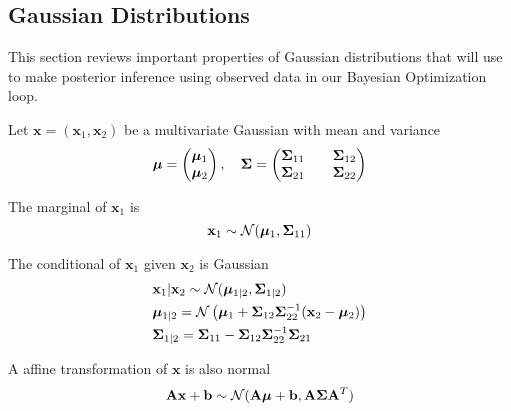 \subsection{Gaussian Distributions}

This section reviews important properties of Gaussian distributions that will use to make posterior inference using observed data in our Bayesian Optimization loop.


\begin{theorem}\label{thm:ogag}
    Let $\mathbf{x} = (\mathbf{x}_1, \mathbf{x}_2)$ be a multivariate Gaussian with mean and variance
    \begin{equation*}
        \boldsymbol{\mu} = \begin{pmatrix}
            \boldsymbol{\mu}_1 \\ \boldsymbol{\mu}_2
        \end{pmatrix},\quad
        \boldsymbol{\Sigma} = \begin{pmatrix}
            \boldsymbol{\Sigma}_{11} && \boldsymbol{\Sigma}_{12} \\
            \boldsymbol{\Sigma}_{21} && \boldsymbol{\Sigma}_{22} \\
        \end{pmatrix}
    \end{equation*}

    The marginal of $\mathbf{x}_1$ is
    \begin{equation*}
        \mathbf{x}_{1} \sim \mathcal{N}(\boldsymbol{\mu}_1, \boldsymbol{\Sigma}_{11})
    \end{equation*}
    
    The conditional of $\mathbf{x}_1$ given $\mathbf{x}_2$ is Gaussian
    \begin{align*}
        &\mathbf{x}_1 | \mathbf{x}_2 \sim \mathcal{N}(\boldsymbol{\mu}_{1 | 2}, \boldsymbol{\Sigma}_{1 | 2}) \\
        &\boldsymbol{\mu}_{1 | 2} = \mathcal{N}\left(\boldsymbol{\mu}_1 + \boldsymbol{\Sigma}_{12} \boldsymbol{\Sigma}_{22}^{-1} (\mathbf{x}_2 - \boldsymbol{\mu}_2)\right) \\
        &\boldsymbol{\Sigma}_{1|2 } = \boldsymbol{\Sigma}_{11} - \boldsymbol{\Sigma}_{12} \boldsymbol{\Sigma}_{22}^{-1} \boldsymbol{\Sigma}_{21}
    \end{align*}
    
    A affine transformation of $\mathbf{x}$ is also normal
    \begin{equation*}
        \mathbf{Ax} + \mathbf{b} \sim \mathcal{N}(
        \mathbf{A} \boldsymbol{\mu} + \mathbf{b},
        \mathbf{A} \boldsymbol{\Sigma} \mathbf{A}^{T}
        )
    \end{equation*}
    
\end{theorem}
